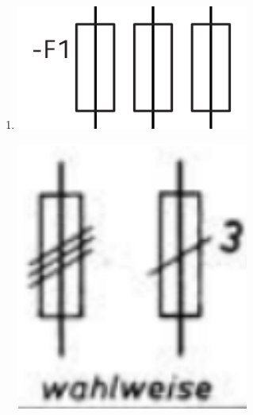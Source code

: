 \begin{enumerate}
    \item   {}
        
        \begin{minipage}[t]{0.5\textwidth}
            
                \centering
                \includegraphics[width = 0.6\textwidth]{img/Schmelzsicherungen.png}
            
        \end{minipage}
        \begin{minipage}[t]{0.5\textwidth}
            
                \centering
                \includegraphics[width = 0.6\textwidth]{img/Schmelzsicherungen_einpolige_Darstellung.png}
            
        \end{minipage}


\end{enumerate}
